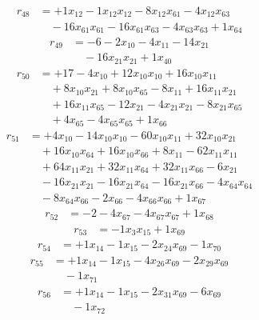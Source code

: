 \[\begin{aligned}
r_{48} &= + 1 x_{12} - 1 x_{12} x_{12} - 8 x_{12} x_{61} - 4 x_{12} x_{63} \\
 &\quad - 16 x_{61} x_{61} - 16 x_{61} x_{63} - 4 x_{63} x_{63} + 1 x_{64}
\end{aligned}\]
\[\begin{aligned}
r_{49} &= - 6 - 2 x_{10} - 4 x_{11} - 14 x_{21} \\
 &\quad - 16 x_{21} x_{21} + 1 x_{40}
\end{aligned}\]
\[\begin{aligned}
r_{50} &= + 17 - 4 x_{10} + 12 x_{10} x_{10} + 16 x_{10} x_{11} \\
 &\quad + 8 x_{10} x_{21} + 8 x_{10} x_{65} - 8 x_{11} + 16 x_{11} x_{21} \\
 &\quad + 16 x_{11} x_{65} - 12 x_{21} - 4 x_{21} x_{21} - 8 x_{21} x_{65} \\
 &\quad + 4 x_{65} - 4 x_{65} x_{65} + 1 x_{66}
\end{aligned}\]
\[\begin{aligned}
r_{51} &= + 4 x_{10} - 14 x_{10} x_{10} - 60 x_{10} x_{11} + 32 x_{10} x_{21} \\
 &\quad + 16 x_{10} x_{64} + 16 x_{10} x_{66} + 8 x_{11} - 62 x_{11} x_{11} \\
 &\quad + 64 x_{11} x_{21} + 32 x_{11} x_{64} + 32 x_{11} x_{66} - 6 x_{21} \\
 &\quad - 16 x_{21} x_{21} - 16 x_{21} x_{64} - 16 x_{21} x_{66} - 4 x_{64} x_{64} \\
 &\quad - 8 x_{64} x_{66} - 2 x_{66} - 4 x_{66} x_{66} + 1 x_{67}
\end{aligned}\]
\[\begin{aligned}
r_{52} &= - 2 - 4 x_{67} - 4 x_{67} x_{67} + 1 x_{68}
\end{aligned}\]
\[\begin{aligned}
r_{53} &= - 1 x_{3} x_{15} + 1 x_{69}
\end{aligned}\]
\[\begin{aligned}
r_{54} &= + 1 x_{14} - 1 x_{15} - 2 x_{24} x_{69} - 1 x_{70}
\end{aligned}\]
\[\begin{aligned}
r_{55} &= + 1 x_{14} - 1 x_{15} - 4 x_{26} x_{69} - 2 x_{29} x_{69} \\
 &\quad - 1 x_{71}
\end{aligned}\]
\[\begin{aligned}
r_{56} &= + 1 x_{14} - 1 x_{15} - 2 x_{31} x_{69} - 6 x_{69} \\
 &\quad - 1 x_{72}
\end{aligned}\]
